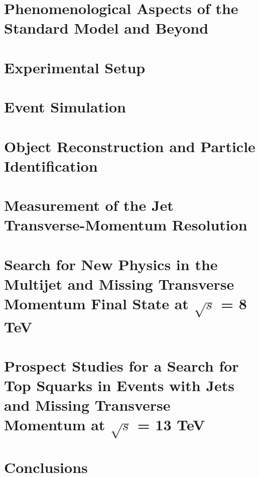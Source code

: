 \documentclass[
twoside,
headsepline,     %
headings=normal,
openright,
numbers=noenddot, %
a4paper
]{scrreprt} %
\begin{document}
\chapter{Phenomenological Aspects of the Standard Model and Beyond} \label{chap:Theory}


\chapter{Experimental Setup} \label{chap:Detector}


\chapter{Event Simulation} \label{chap:Simulation}


\chapter{Object Reconstruction and Particle Identification} \label{chap:Objects}


\chapter{Measurement of the Jet Transverse-Momentum Resolution} \label{chap:Resolution}


\chapter[Search for New Physics with Jets and Missing Transverse Momentum]{Search for New Physics in the Multijet and Missing Transverse Momentum Final State at $\sqrt{s}$ = 8 TeV} \label{chap:RA2}


\chapter[Prospect Studies for a Search for Top Squarks at $\sqrt{s}$ = 13 TeV]{Prospect Studies for a Search for Top Squarks in Events with Jets and Missing Transverse Momentum at $\sqrt{s}$ = 13 TeV} \label{chap:Stop}


\chapter{Conclusions} \label{chap:Conclusion}

\end{document}

